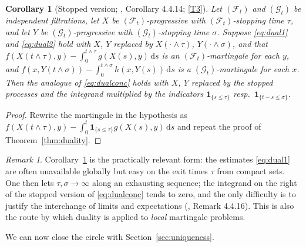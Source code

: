 \documentclass[11pt,a4paper]{article}
\theoremstyle{plain}
\newtheorem{corollary}[theorem]{Corollary}
\theoremstyle{definition}
\theoremstyle{remark}
\newtheorem{remark}[theorem]{Remark}
\newcommand{\Filt}{\mathcal{F}}
\newcommand{\Gilt}{\mathcal{G}}
\newcommand{\one}{\mathbf{1}}
\newcommand{\dif}{\,\mathrm{d}}
\newcommand{\EK}{\cite{EK86}}
\begin{document}
\begin{corollary}[Stopped version; \EK, Corollary 4.4.14; \eqref{T3}]
  \label{cor:dualstopped}
  Let $(\Filt_t)$ and $(\Gilt_t)$ be independent filtrations, let $X$ be
  $(\Filt_t)$-progressive with $(\Filt_t)$-stopping time $\tau$, and let $Y$ be
  $(\Gilt_t)$-progressive with $(\Gilt_t)$-stopping time $\sigma$.  Suppose
  \eqref{eq:dual1} and \eqref{eq:dual2} hold with $X$, $Y$ replaced by
  $X(\cdot \wedge \tau)$, $Y(\cdot \wedge \sigma)$, and that
  $f(X(t \wedge \tau),y) - \int_0^{t \wedge \tau} g(X(s),y) \dif s$ is an
  $(\Filt_t)$-martingale for each $y$, and
  $f(x,Y(t \wedge \sigma)) - \int_0^{t \wedge \sigma} h(x,Y(s)) \dif s$ is a
  $(\Gilt_t)$-martingale for each $x$.  Then the analogue of
  \eqref{eq:dualconc} holds with $X$, $Y$ replaced by the stopped processes and
  the integrand multiplied by the indicators $\one_{\{s \leq \tau\}}$ resp.\
  $\one_{\{t-s \leq \sigma\}}$.
\end{corollary}

\begin{proof}
  Rewrite the martingale in the hypothesis as
  $f(X(t \wedge \tau),y) - \int_0^t \one_{\{s \leq \tau\}} g(X(s),y) \dif s$ and
  repeat the proof of Theorem~\ref{thm:duality}.
\end{proof}

\begin{remark}
  \label{rem:dualstopped}
  Corollary~\ref{cor:dualstopped} is the practically relevant form: the
  estimates \eqref{eq:dual1} are often unavailable globally but easy on the
  exit times $\tau$ from compact sets.  One then lets $\tau, \sigma \to \infty$
  along an exhausting sequence; the integrand on the right of the stopped version
  of \eqref{eq:dualconc} tends to zero, and the only difficulty is to justify the
  interchange of limits and expectations (\EK, Remark 4.4.16).  This is also the
  route by which duality is applied to \emph{local} martingale problems.
\end{remark}

We can now close the circle with Section~\ref{sec:uniqueness}.
\end{document}
